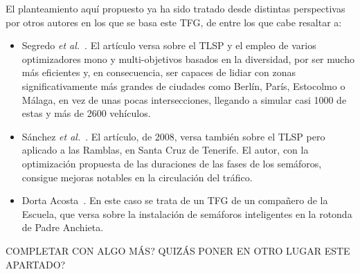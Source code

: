 El planteamiento aquí propuesto ya ha sido tratado desde distintas perspectivas por otros autores en los que se basa este TFG, de entre los que cabe resaltar a:

\begin{itemize}
    \item Segredo \textit{et al.}~\cite{segredo_optimising_2019}. El artículo versa sobre el TLSP y el empleo de varios optimizadores mono y multi-objetivos basados en la diversidad, por ser mucho más eficientes y, en consecuencia, ser capaces de lidiar con zonas significativamente más grandes de ciudades como Berlín, París, Estocolmo o Málaga, en vez de unas pocas intersecciones, llegando a simular casi 1000 de estas y más de 2600 vehículos.
    \item Sánchez \textit{et al.}~\cite{sanchez_applying_2008}. El artículo, de 2008, versa también sobre el TLSP pero aplicado a las Ramblas, en Santa Cruz de Tenerife. El autor, con la optimización propuesta de las duraciones de las fases de los semáforos, consigue mejoras notables en la circulación del tráfico.
    \item Dorta Acosta~\cite{dorta_acosta_simulacion_2019}. En este caso se trata de un TFG de un compañero de la Escuela, que versa sobre la instalación de semáforos inteligentes en la rotonda de Padre Anchieta.
\end{itemize}


{\color{BurntOrange} COMPLETAR CON ALGO MÁS? QUIZÁS PONER EN OTRO LUGAR ESTE APARTADO?}









